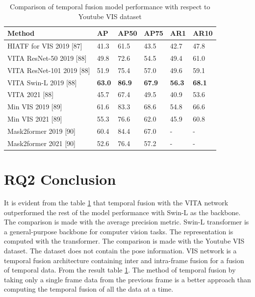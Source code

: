 	\begin{table}[h]
   		\begin{center}
   			\begin{tabular}{ | l | l| l| l| l| p{2cm} |}
   				\hline
   				
   				\cellcolor{purple!30}Method & \cellcolor{purple!30}AP & \cellcolor{purple!30}AP50 & \cellcolor{purple!30}AP75 & \cellcolor{purple!30}AR1 & \cellcolor{purple!30}AR10 \\ \hline
   				HIATF for VIS 2019 [87] & 41.3 & 61.5 & 43.5 & 42.7 & 47.8 \\ \hline
   				VITA ResNet-50 2019 [88]  & 49.8 & 72.6 & 54.5 & 49.4 & 61.0  \\ \hline
   				VITA ResNet-101 2019 [88]  & 51.9 & 75.4 & 57.0 & 49.6 & 59.1 \\ \hline
   				VITA Swin-L 2019 [88]  & { \bf 63.0}  & { \bf 86.9} & { \bf 67.9} & { \bf 56.3} & { \bf 68.1} \\ \hline
   				VITA 2021 [88]  & 45.7 & 67.4 & 49.5 & 40.9 & 53.6 \\ \hline
   				Min VIS 2019 [89] & 61.6 & 83.3 & 68.6 & 54.8 & 66.6 \\ \hline
   				Min VIS 2021 [89] & 55.3 & 76.6 & 62.0 & 45.9 & 60.8 \\ \hline
   				Mask2former 2019 [90]  & 60.4 & 84.4 & 67.0 & - & - \\ \hline
   				Mask2former 2021 [90]  & 52.6 & 76.4 & 57.2 & - & - \\ \hline
   				\hline
   			\end{tabular}
   			\caption{Comparison of temporal fusion model performance with respect to Youtube VIS dataset}
   			\label{tab:sota_ytube_vis}
   		\end{center}
   	\end{table}
    
   	\section{RQ2 Conclusion}
    
	 It is evident from the table \ref{tab:sota_ytube_vis} that temporal fusion with the VITA network outperformed the rest of the model performance with Swin-L as the backbone. The comparison is made with the average precision metric. Swin-L transformer is a general-purpose backbone for computer vision tasks. The representation is computed with the transformer. The comparison is made with the Youtube VIS dataset. The dataset does not contain the pose information. VIS network is a temporal fusion architecture containing inter and intra-frame fusion for a fusion of temporal data. From the result table \ref{tab:sota_ytube_vis}. The method of temporal fusion by taking only a single frame data from the previous frame is a better approach than computing the temporal fusion of all the data at a time.
    
